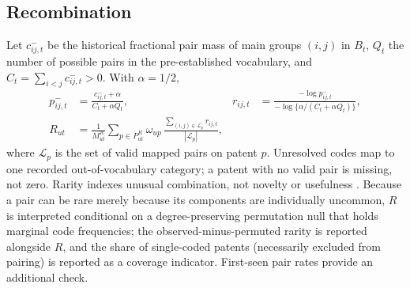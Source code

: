 \subsection{Recombination}
Let $c^-_{ij,t}$ be the historical fractional pair mass of main groups
$(i,j)$ in $B_t$, $Q_t$ the number of possible pairs in the pre-established
vocabulary, and $C_t=\sum_{i<j}c^-_{ij,t}>0$. With $\alpha=1/2$,
\begin{align}
p^-_{ij,t}&=\frac{c^-_{ij,t}+\alpha}{C_t+\alpha Q_t},&
r_{ij,t}&=\frac{-\log p^-_{ij,t}}{-\log\{\alpha/(C_t+\alpha Q_t)\}},\\
R_{ut}&=\frac{1}{M^R_{ut}}\sum_{p\in P^R_{ut}}\omega_{up}\,
\frac{\sum_{(i,j)\in\mathcal{L}_p}r_{ij,t}}{|\mathcal{L}_p|},
\label{eq:recombination}
\end{align}
where $\mathcal{L}_p$ is the set of valid mapped pairs on patent $p$.
Unresolved codes map to one recorded out-of-vocabulary category; a patent with
no valid pair is missing, not zero. Rarity indexes unusual combination, not
novelty or usefulness \citep{fleming2001,youn2015,verhoeven2016}. Because a pair can be rare merely because its components are individually
uncommon, $R$ is interpreted conditional on a degree-preserving permutation
null that holds marginal code frequencies; the observed-minus-permuted rarity
is reported alongside $R$, and the share of single-coded patents (necessarily
excluded from pairing) is reported as a coverage indicator. First-seen pair
rates provide an additional check.

